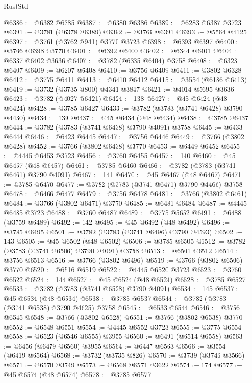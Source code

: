 \begin{lexlean}{RustStd}
\begin{coremodule}
@6386 := @6382 @6385
@6387 := @6380 @6386
@6389 := @6283 @6387 @3723
@6391 := @3781 (@6378 @6389)
@6392 := @3766 @6391
@6393 := @5564 @4125
@6397 := @3761 (@3762 @941) @3770 @3723
@6398 := @6393 @6397
@6400 := @3766 @6398 @3770
@6401 := @6392 @6400
@6402 := @6344 @6401
@6404 := @6337 @6402 @3636
@6407 := @3782 (@6335 @6404) @3758
@6408 := @6323 @6407
@6409 := @6207 @6408
@6410 := @3756 @6409
@6411 := @3802 @6328
@6412 := @3775 @6411
@6413 := @6410 @6412
@6415 := @3554 (@6186 @6413)
@6419 := @3732 (@3735 @800) @4341 @3847
@6421 := @4014 @5695 @3636
@6423 := @3782 (@4027 @6421)
@6424 := 138
@6427 := @45 @6424 (@48 @6424)
@6428 := @3785 @6427
@6433 := @3782 (@3783 (@3741 @6428) @3790 @4430)
@6434 := 139
@6437 := @45 @6434 (@48 @6434)
@6438 := @3785 @6437
@6444 := @3782 (@3783 (@3741 @6438) @3790 @4091) @3758
@6445 := @6433 @6444
@6446 := @6423 @6445
@6447 := @3756 @6446
@6449 := @3766 (@3802 @6428)
@6452 := @3766 (@3802 @6438) @3770
@6453 := @6449 @6452
@6455 := @4445 @6453 @3723
@6456 := @3760 @6455
@6457 := 140
@6460 := @45 @6457 (@48 @6457)
@6461 := @3785 @6460
@6466 := @3782 (@3783 (@3741 @6461) @3790 @4091)
@6467 := 141
@6470 := @45 @6467 (@48 @6467)
@6471 := @3785 @6470
@6477 := @3782 (@3783 (@3741 @6471) @3790 @4466) @3758
@6478 := @6466 @6477
@6479 := @3756 @6478
@6481 := @3766 (@3802 @6461)
@6484 := @3766 (@3802 @6471) @3770
@6485 := @6481 @6484
@6487 := @4445 @6485 @3723
@6488 := @3760 @6487
@6489 := @3775 @5652
@6491 := @6488 (@3759 @6489)
@6492 := 142
@6495 := @45 @6492 (@48 @6492)
@6496 := @3785 @6495
@6501 := @3782 (@3783 (@3741 @6496) @3790 @4593)
@6502 := 143
@6505 := @45 @6502 (@48 @6502)
@6506 := @3785 @6505
@6512 := @3782 (@3783 (@3741 @6506) @3790 @4091) @3758
@6513 := @6501 @6512
@6514 := @3756 @6513
@6516 := @3766 (@3802 @6496)
@6519 := @3766 (@3802 @6506) @3770
@6520 := @6516 @6519
@6522 := @4445 @6520 @3723
@6523 := @3760 @6522
@6524 := 144
@6527 := @45 @6524 (@48 @6524)
@6528 := @3785 @6527
@6533 := @3782 (@3783 (@3741 @6528) @3790 @4091)
@6534 := 145
@6537 := @45 @6534 (@48 @6534)
@6538 := @3785 @6537
@6544 := @3782 (@3783 (@3741 @6538) @3790 @4625) @3758
@6545 := @6533 @6544
@6546 := @3756 @6545
@6548 := @3766 (@3802 @6528)
@6551 := @3766 (@3802 @6538) @3770
@6552 := @6548 @6551
@6554 := @4445 @6552 @3723
@6555 := @3775 @6554
@6558 := @6523 (@6546 @6555) @3955
@6560 := @6491 (@6514 @6558)
@6563 := @6456 (@6479 @6560) @3955
@6564 := @6447 @6563
@6566 := @3554 (@6419 @6564)
@6568 := @3732 (@3735 @826)
@6570 := @3739 (@3746 @3566)
@6571 := @6570 @3749
@6573 := @6568 @6571 @3622
@6574 := 174
@6577 := @45 @6574 (@48 @6574)
@6578 := @3785 @6577

\end{coremodule}
\end{lexlean}
